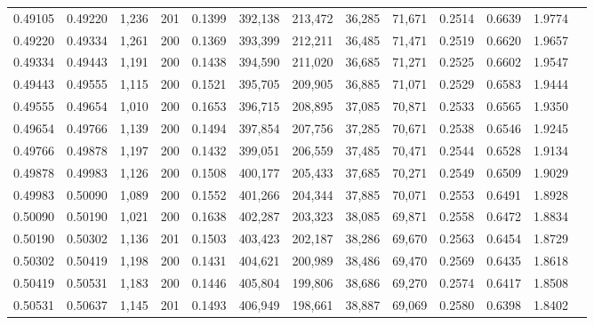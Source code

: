 \begin{tabular}{rrrrrrrrrrrrr}
0.49105 & 0.49220 & 1,236 & 201 &                                     0.1399 & 392,138 & 213,472 &  36,285 &  71,671 & 0.2514 & 0.6639 & 1.9774 \\
0.49220 & 0.49334 & 1,261 & 200 &                                     0.1369 & 393,399 & 212,211 &  36,485 &  71,471 & 0.2519 & 0.6620 & 1.9657 \\
0.49334 & 0.49443 & 1,191 & 200 &                                     0.1438 & 394,590 & 211,020 &  36,685 &  71,271 & 0.2525 & 0.6602 & 1.9547 \\
0.49443 & 0.49555 & 1,115 & 200 &                                     0.1521 & 395,705 & 209,905 &  36,885 &  71,071 & 0.2529 & 0.6583 & 1.9444 \\
0.49555 & 0.49654 & 1,010 & 200 &                                     0.1653 & 396,715 & 208,895 &  37,085 &  70,871 & 0.2533 & 0.6565 & 1.9350 \\
0.49654 & 0.49766 & 1,139 & 200 &                                     0.1494 & 397,854 & 207,756 &  37,285 &  70,671 & 0.2538 & 0.6546 & 1.9245 \\
0.49766 & 0.49878 & 1,197 & 200 &                                     0.1432 & 399,051 & 206,559 &  37,485 &  70,471 & 0.2544 & 0.6528 & 1.9134 \\
0.49878 & 0.49983 & 1,126 & 200 &                                     0.1508 & 400,177 & 205,433 &  37,685 &  70,271 & 0.2549 & 0.6509 & 1.9029 \\
0.49983 & 0.50090 & 1,089 & 200 &                                     0.1552 & 401,266 & 204,344 &  37,885 &  70,071 & 0.2553 & 0.6491 & 1.8928 \\
0.50090 & 0.50190 & 1,021 & 200 &                                     0.1638 & 402,287 & 203,323 &  38,085 &  69,871 & 0.2558 & 0.6472 & 1.8834 \\
0.50190 & 0.50302 & 1,136 & 201 &                                     0.1503 & 403,423 & 202,187 &  38,286 &  69,670 & 0.2563 & 0.6454 & 1.8729 \\
0.50302 & 0.50419 & 1,198 & 200 &                                     0.1431 & 404,621 & 200,989 &  38,486 &  69,470 & 0.2569 & 0.6435 & 1.8618 \\
0.50419 & 0.50531 & 1,183 & 200 &                                     0.1446 & 405,804 & 199,806 &  38,686 &  69,270 & 0.2574 & 0.6417 & 1.8508 \\
0.50531 & 0.50637 & 1,145 & 201 &                                     0.1493 & 406,949 & 198,661 &  38,887 &  69,069 & 0.2580 & 0.6398 & 1.8402 \\

\end{tabular}
